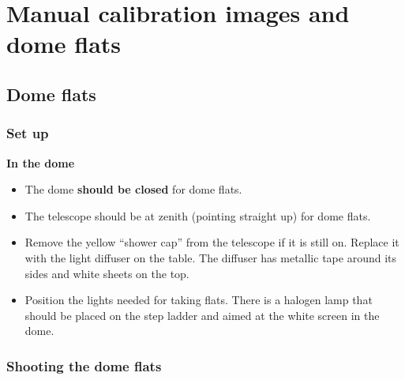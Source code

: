 \documentclass[letterpaper, 12pt]{report}
\newcommand{\location}[1]{\noindent\large{\textbf{#1}}}
\newcommand{\indome}{\location{In the dome}}
\begin{document}
\chapter{Manual calibration images and dome flats}

\section{Dome flats}
\label{sec:dome_flats}

\subsection{Set up}
\indome
\begin{itemize}
	\item The dome \textbf{should be closed} for dome flats.
	\item The telescope should be at zenith (pointing straight up) for dome flats.
	\item Remove the yellow ``shower cap'' from the telescope if it is still on. Replace it with the light diffuser on the table. The diffuser has metallic tape around its sides and white sheets on the top.
	\item Position the lights needed for taking flats. There is a halogen lamp that should be placed on the step ladder and aimed at the white screen in the dome.
\end{itemize}

\subsection{Shooting the dome flats} %
\label{sub:shooting_the_dome_flats}
\end{document}
